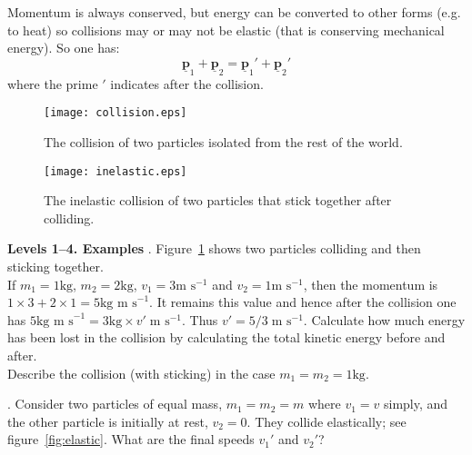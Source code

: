 \documentclass[a4paper,11pt]{article}
\newcommand{\vtr}[1] {\mathit{\underline{\boldsymbol{#1}}}}
\def\nl{\hfil\break}
\begin{document}
Momentum is always conserved, but energy can be converted to other forms (e.g. to heat) so collisions may or may not be elastic (that is conserving mechanical energy).  So one has:
\begin{equation*} \vtr{p}_1 +  \vtr{p}_2 = \vtr{p}_1'  + \vtr{p}_2'
\end{equation*}
where the prime $'$ indicates after the collision.\\
\begin{figure}[h!]%
\begin{minipage}{.45\textwidth}
  \centering
  \texttt{[image: collision.eps]}
  \caption{The collision of two particles isolated from the rest of the world.}
  \label{fig:collision}
\end{minipage}\hfill
\begin{minipage}{.45\textwidth}
  \centering
  \texttt{[image: inelastic.eps]}
  \caption{The inelastic collision of two particles that stick together after colliding.}
  \label{fig:inelastic}
\end{minipage}
\end{figure}

\nl
{\bf Levels 1--4.  Examples}
\nl
1.  Figure~\ref{fig:inelastic} shows two particles colliding and then sticking together.\\
If $m_1 = 1 \textrm{kg}$, $m_2 = 2\textrm{kg}$, $v_1 = 3 \textrm{m s}^{-1}$ and
$v_2 = 1\textrm{m s}^{-1}$, then the momentum is $1 \times 3 + 2 \times 1  = 5 \textrm{kg m s}^{-1}$.
It remains this value and hence after the collision one has $5 \textrm{kg m s}^{-1} = 3 \textrm{kg} \times v' \; \textrm{m s}^{-1}$.  Thus $ v' = 5/3 \; \textrm{m s}^{-1}$.
\nl
Calculate how much energy has been lost in the collision by calculating the total kinetic energy before and after.\\
Describe the collision (with sticking) in the case $m_1 = m_2 = 1\textrm{kg}$.\\

\vfill\break

\nl
2.  Consider two particles of equal mass, $m_1 = m_2 = m$ where $v_1 = v$ simply, and the other particle is initially at rest, $v_2=0$.  They collide elastically; see figure~\ref{fig:elastic}.  What are the final speeds $v_1'$ and $v_2'$?
\end{document}
